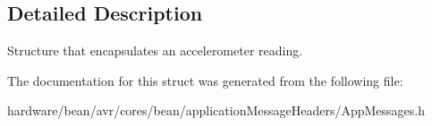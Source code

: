 \subsection{Detailed Description}
Structure that encapsulates an accelerometer reading. 

The documentation for this struct was generated from the following file\+:\begin{DoxyCompactItemize}
\item 
hardware/bean/avr/cores/bean/application\+Message\+Headers/App\+Messages.\+h\end{DoxyCompactItemize}
